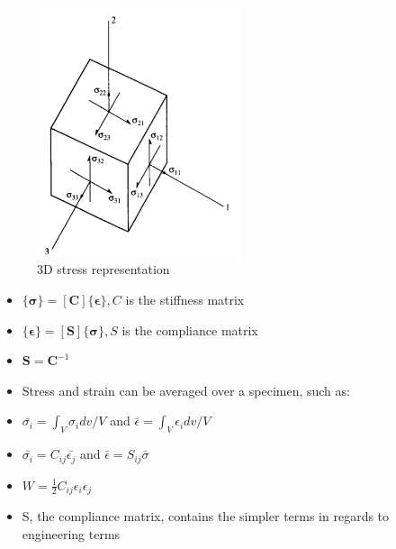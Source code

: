 \documentclass[11pt]{article}
\begin{document}
    \begin{figure}[H]
        \includegraphics[width=6cm]{3D_stress_state}\centering
        \caption{3D stress representation}
        \label{fig:2}
    \end{figure}

    \begin{itemize}
        \item{$\{ \pmb{\sigma} \} = [\mathbf{C}] \{ \pmb{\epsilon} \}, C$ is the stiffness matrix}
        \item{$\{ \pmb{\epsilon} \} = [\mathbf{S}] \{ \pmb{\sigma} \}, S$ is the compliance matrix}
        \item{$\mathbf{S} = \mathbf{C}^{-1}$}
        \item{Stress and strain can be averaged over a specimen, such as:}
        \item{$ \bar{\sigma_i} = \int_V{\sigma_i}dv/V$ and $ \bar{\epsilon} = \int_V{\epsilon_i}dv/V$}
        \item{$ \bar{\sigma_i} = C_{ij} \bar{\epsilon_j}$ and $ \bar{\epsilon} = S_{ij} \bar{\sigma}$}
        \item{$ W = \frac{1}{2} C_{ij} \epsilon_i \epsilon_j$}
        \item{S, the compliance matrix, contains the simpler terms in regards to engineering terms}
    \end{itemize}
\end{document}
